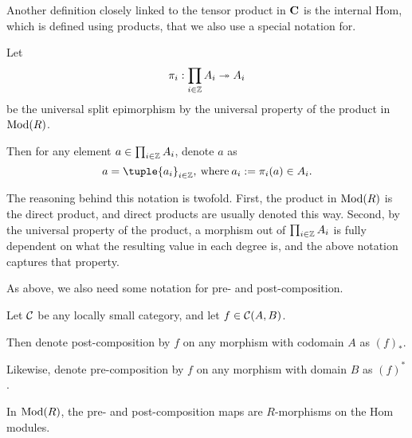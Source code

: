 Another definition closely linked to the tensor product in \( \operatorname{\mathbf{C}} \) is the internal Hom, which is defined using products, that we also use a special notation for.
\begin{notation}
    \label{not:prod}
    Let 
    \[
        \pi_i: \prod_{i \in {\mathbb{Z}}} A_i \twoheadrightarrow A_i
    \]
    be the universal split epimorphism by the universal property of the product in \( \operatorname{Mod}(R) \).
    
    Then for any element \( a \in \prod_{i \in {\mathbb{Z}}} A_i \), denote \( a \) as
    \[
        a = \tuple{a_i}_{i \in \Zb}, \: \text{where} \: a_i := \pi_i(a) \in A_i.
    \]
\end{notation}

The reasoning behind this notation is twofold. First, the product in \( \operatorname{Mod}(R) \) is the direct product, and direct products are usually denoted this way. Second, by the universal property of the product, a morphism out of \( \prod_{i \in {\mathbb{Z}}} A_i \) is fully dependent on what the resulting value in each degree is, and the above notation captures that property.

As above, we also need some notation for pre- and post-composition.
\begin{notation}
    Let \( {\mathcal{C}} \) be any locally small category, and let \( f \in {\mathcal{C}}(A, B) \).

    Then denote post-composition by \( f \) on any morphism with codomain \( A \) as \( (f)_* \).

    Likewise, denote pre-composition by \( f \) on any morphism with domain \( B \) as \( (f)^* \).
\end{notation}
In \( \operatorname{Mod}(R) \), the pre- and post-composition maps are \( R \)-morphisms on the Hom modules.

